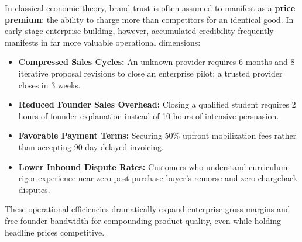 In classical economic theory, brand trust is often assumed to manifest as a \textbf{price premium}: the ability to charge more than competitors for an identical good. In early-stage enterprise building, however, accumulated credibility frequently manifests in far more valuable operational dimensions:
\begin{itemize}
\item \textbf{Compressed Sales Cycles:} An unknown provider requires 6 months and 8 iterative proposal revisions to close an enterprise pilot; a trusted provider closes in 3 weeks.
\item \textbf{Reduced Founder Sales Overhead:} Closing a qualified student requires 2 hours of founder explanation instead of 10 hours of intensive persuasion.
\item \textbf{Favorable Payment Terms:} Securing 50\% upfront mobilization fees rather than accepting 90-day delayed invoicing.
\item \textbf{Lower Inbound Dispute Rates:} Customers who understand curriculum rigor experience near-zero post-purchase buyer's remorse and zero chargeback disputes.
\end{itemize}

These operational efficiencies dramatically expand enterprise gross margins and free founder bandwidth for compounding product quality, even while holding headline prices competitive.
